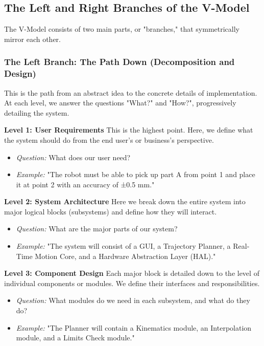 \subsection{The Left and Right Branches of the V-Model}

The V-Model consists of two main parts, or "branches," that symmetrically mirror each other.

\subsubsection{The Left Branch: The Path Down (Decomposition and Design)}
This is the path from an abstract idea to the concrete details of implementation. At each level, we answer the questions "What?" and "How?", progressively detailing the system.

\textbf{Level 1: User Requirements}
This is the highest point. Here, we define what the system should do from the end user's or business's perspective.
\begin{itemize}
    \item \textit{Question:} What does our user need?
    \item \textit{Example:} "The robot must be able to pick up part A from point 1 and place it at point 2 with an accuracy of ±0.5 mm."
\end{itemize}

\textbf{Level 2: System Architecture}
Here we break down the entire system into major logical blocks (subsystems) and define how they will interact.
\begin{itemize}
    \item \textit{Question:} What are the major parts of our system?
    \item \textit{Example:} "The system will consist of a GUI, a Trajectory Planner, a Real-Time Motion Core, and a Hardware Abstraction Layer (HAL)."
\end{itemize}

\textbf{Level 3: Component Design}
Each major block is detailed down to the level of individual components or modules. We define their interfaces and responsibilities.
\begin{itemize}
    \item \textit{Question:} What modules do we need in each subsystem, and what do they do?
    \item \textit{Example:} "The Planner will contain a Kinematics module, an Interpolation module, and a Limits Check module."
\end{itemize}

